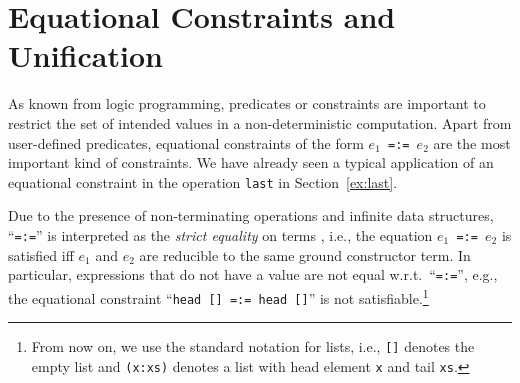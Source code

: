 \documentclass{llncs}
\newcommand{\code}[1]{\mbox{\small\texttt{#1}}}
\newcommand{\ccode}[1]{``\code{#1}''}
\begin{document}
\section{Equational Constraints and Unification}
\label{sec:Unification}

As known from logic programming, predicates or constraints
are important to restrict the set of intended values
in a non-deterministic computation.
Apart from user-defined predicates,
equational constraints of the form \code{$e_1$\,=:=\,$e_2$}
are the most important kind of constraints.
We have already seen a typical application
of an equational constraint in the operation
\code{last} in Section~\ref{ex:last}.

Due to the presence of non-terminating operations
and infinite data structures,
\ccode{=:=} is interpreted as the \emph{strict equality} on terms
\cite{GiovannettiLeviMoisoPalamidessi91},
i.e., the equation \code{$e_1$\,=:=\,$e_2$} is satisfied iff
$e_1$ and $e_2$ are reducible to the same ground constructor term.
In particular, expressions that do not have a value
are not equal w.r.t.\ \ccode{=:=}, e.g.,
the equational constraint \ccode{head [] =:= head []}
is not satisfiable.\footnote{From now on, we use the
standard notation for lists, i.e., \code{[]} denotes the empty list
and \code{(x:xs)} denotes a list with head element \code{x}
and tail \code{xs}.}
\end{document}
